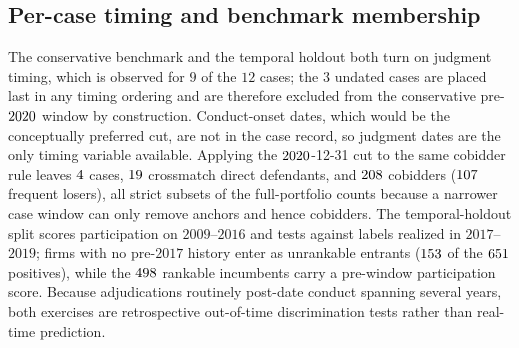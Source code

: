 \subsection{Per-case timing and benchmark membership}

The conservative benchmark and the temporal holdout both turn on
judgment timing, which is observed for $9$ of the $12$ cases; the $3$
undated cases are placed last in any timing ordering and are therefore
excluded from the conservative pre-$2020$ window by
construction. Conduct-onset dates, which would be the conceptually
preferred cut, are not in the case record, so judgment dates are the
only timing variable available. Applying the
$2020$-12-31 cut to the same cobidder rule leaves
$4$ cases, $19$ crossmatch direct
defendants, and $208$ cobidders
($107$ frequent losers), all strict subsets of the
full-portfolio counts because a narrower case window can only remove
anchors and hence cobidders. The temporal-holdout split scores
participation on $2009$--$2016$ and tests against labels realized in
$2017$--$2019$; firms with no pre-$2017$ history enter as unrankable
entrants ($153$ of the $651$
positives), while the $498$ rankable incumbents carry
a pre-window participation score. Because adjudications routinely
post-date conduct spanning several years, both exercises are
retrospective out-of-time discrimination tests rather than real-time
prediction.
